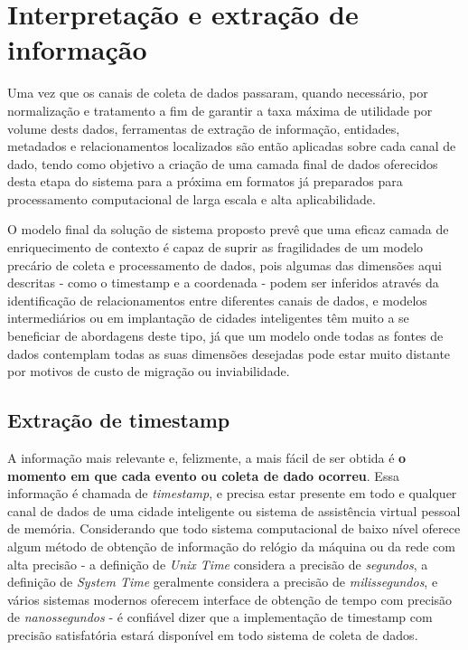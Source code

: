 \section{Interpretação e extração de informação}

Uma vez que os canais de coleta de dados passaram, quando necessário, por normalização e tratamento a fim de garantir a taxa máxima de utilidade por volume dests dados, ferramentas de extração de informação, entidades, metadados e relacionamentos localizados são então aplicadas sobre cada canal de dado, tendo como objetivo a criação de uma camada final de dados oferecidos desta etapa do sistema para a próxima em formatos já preparados para processamento computacional de larga escala e alta aplicabilidade.

 O modelo final da solução de sistema proposto prevê que uma eficaz camada de enriquecimento de contexto é capaz de suprir as fragilidades de um modelo precário de coleta e processamento de dados, pois algumas das dimensões aqui descritas - como o timestamp e a coordenada - podem ser inferidos através da identificação de relacionamentos entre diferentes canais de dados, e modelos intermediários ou em implantação de cidades inteligentes têm muito a se beneficiar de abordagens deste tipo, já que um modelo onde todas as fontes de dados contemplam todas as suas dimensões desejadas pode estar muito distante por motivos de custo de migração ou inviabilidade.

\subsection{Extração de timestamp}

A informação mais relevante e, felizmente, a mais fácil de ser obtida é \textbf{o momento em que cada evento ou coleta de dado ocorreu}. Essa informação é chamada de \textit{timestamp}, e precisa estar presente em todo e qualquer canal de dados de uma cidade inteligente ou sistema de assistência virtual pessoal de memória. Considerando que todo sistema computacional de baixo nível oferece algum método de obtenção de informação do relógio da máquina ou da rede com alta precisão - a definição de \textit{Unix Time} considera a precisão de \textit{segundos}, a definição de \textit{System Time} geralmente considera a precisão de \textit{milissegundos}, e vários sistemas modernos oferecem interface de obtenção de tempo com precisão de \textit{nanossegundos} - é confiável dizer que a implementação de timestamp com precisão satisfatória estará disponível em todo sistema de coleta de dados.

